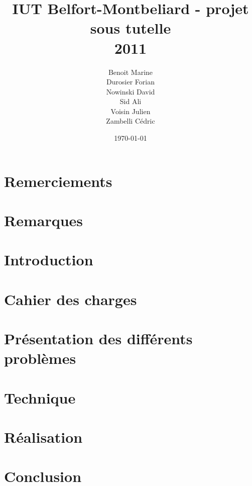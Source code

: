 \documentclass[a4paper, 11pt, oneside]{report}
\title{
    IUT Belfort-Montbeliard - projet sous tutelle\\
    2011\\
    \bigskip {\Huge Sensibilisation à la complexité et à la recherche opérationnelle}
}
\author{Benoit Marine\\Durosier Forian\\Nowinski David\\Sid Ali\\Voisin Julien\\Zambelli Cédric}
\date{\today}
\begin{document}
\maketitle

\large

\setcounter{page}{2}
\chapter*{Remerciements}


\setlength{\parskip}{0pt}
\setlength{\parskip}{8pt}

\chapter*{Remarques}


\chapter*{Introduction}


\chapter{Cahier des charges}


\chapter{Présentation des différents problèmes}


\chapter{Technique}


\chapter{Réalisation}


\chapter*{Conclusion}


\clearpage

\setlength{\parskip}{0pt}
\tableofcontents
{}
\setlength{\parskip}{8pt}

\clearpage
{}
\listoffigures
\clearpage


\end{document}
